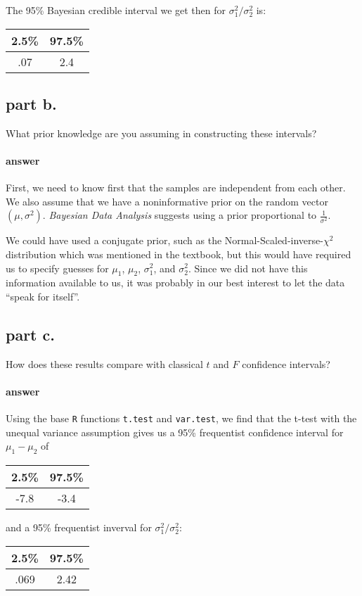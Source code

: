 \documentclass[12pt,a4paper]{article}
\begin{document}
The 95\% Bayesian credible interval we get then for $\sigma^2_1 / \sigma^2_2$ is:

\begin{center}
	\begin{tabular}{|| c | c ||}
		2.5\% & 97.5\% \\
		\hline
		.07 & 2.4
	\end{tabular}
\end{center}

\subsection{part b.}
What prior knowledge are you assuming in constructing these intervals?

\paragraph{answer}
First, we need to know first that the samples are independent from each other.
We also assume that we have a noninformative prior on the random vector $(\mu, \sigma^2)$.
\textit{Bayesian Data Analysis} suggests using a prior proportional to $\frac{1}{\sigma^2}$.

We could have used a conjugate prior, such as the Normal-Scaled-inverse-$\chi^2$ distribution which was mentioned in the textbook, but this would have required us to specify guesses for $\mu_1$, $\mu_2$, $\sigma^2_1$, and $\sigma^2_2$.
Since we did not have this information available to us, it was probably in our best interest to let the data ``speak for itself''.

\subsection{part c.}
How does these results compare with classical $t$ and $F$ confidence intervals?

\paragraph{answer}
Using the base \texttt{R} functions \texttt{t.test} and \texttt{var.test}, we find that the t-test with the unequal variance assumption gives us a 95\% frequentist confidence interval for $\mu_1 - \mu_2$ of 

\begin{center}
	\begin{tabular}{|| c | c ||}
		2.5\% & 97.5\% \\
		\hline
		-7.8 & -3.4
	\end{tabular}
\end{center}
and a 95\% frequentist inverval for $\sigma^2_1 / \sigma^2_2$:
\begin{center}
	\begin{tabular}{|| c | c ||}
		2.5\% & 97.5\% \\
		\hline
		.069 & 2.42	
	\end{tabular}
\end{center}
\end{document}
